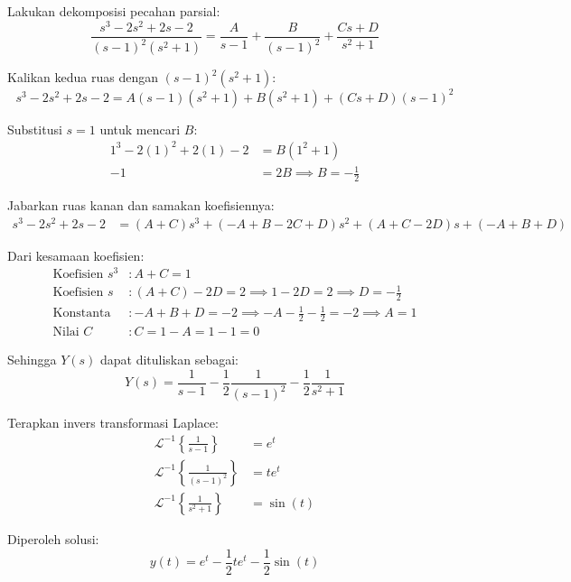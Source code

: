 \documentclass[11pt,a4paper]{article}
\begin{document}
Lakukan dekomposisi pecahan parsial:
\begin{equation*}
    \frac{s^3 - 2s^2 + 2s - 2}{(s - 1)^2(s^2 + 1)} = \frac{A}{s - 1} + \frac{B}{(s - 1)^2} + \frac{Cs + D}{s^2 + 1}
\end{equation*}

Kalikan kedua ruas dengan $(s - 1)^2(s^2 + 1)$:
\begin{equation*}
    s^3 - 2s^2 + 2s - 2 = A(s - 1)(s^2 + 1) + B(s^2 + 1) + (Cs + D)(s - 1)^2
\end{equation*}

Substitusi $s = 1$ untuk mencari $B$:
\begin{align*}
    1^3 - 2(1)^2 + 2(1) - 2 &= B(1^2 + 1) \\
    -1 &= 2B \implies B = -\frac{1}{2}
\end{align*}

Jabarkan ruas kanan dan samakan koefisiennya:
\begin{align*}
    s^3 - 2s^2 + 2s - 2 &= (A + C)s^3 + (-A + B - 2C + D)s^2 + (A + C - 2D)s + (-A + B + D)
\end{align*}

Dari kesamaan koefisien:
\begin{align*}
    \text{Koefisien } s^3 &: A + C = 1 \\
    \text{Koefisien } s &: (A + C) - 2D = 2 \implies 1 - 2D = 2 \implies D = -\frac{1}{2} \\
    \text{Konstanta} &: -A + B + D = -2 \implies -A - \frac{1}{2} - \frac{1}{2} = -2 \implies A = 1 \\
    \text{Nilai } C &: C = 1 - A = 1 - 1 = 0
\end{align*}

Sehingga $Y(s)$ dapat dituliskan sebagai:
\begin{equation*}
    Y(s) = \frac{1}{s - 1} - \frac{1}{2}\frac{1}{(s - 1)^2} - \frac{1}{2}\frac{1}{s^2 + 1}
\end{equation*}

Terapkan invers transformasi Laplace:
\begin{align*}
    \mathcal{L}^{-1}\left\{\frac{1}{s - 1}\right\} &= e^t \\
    \mathcal{L}^{-1}\left\{\frac{1}{(s - 1)^2}\right\} &= t e^t \\
    \mathcal{L}^{-1}\left\{\frac{1}{s^2 + 1}\right\} &= \sin(t)
\end{align*}

Diperoleh solusi:
\begin{equation*}
    y(t) = e^t - \frac{1}{2}t e^t - \frac{1}{2}\sin(t)
\end{equation*}
\end{document}
